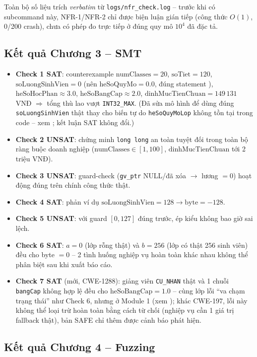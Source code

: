 Toàn bộ số liệu trích \emph{verbatim} từ \texttt{logs/nfr\_check.log} -- trước khi có subcommand này, NFR-1/NFR-2 chỉ được biện luận gián tiếp (công thức $O(1)$, 0/200 crash), chưa có phép đo trực tiếp ở đúng quy mô $10^4$ đã đặc tả.

\subsection{Kết quả Chương 3 -- SMT}

\begin{itemize}
  \item \textbf{Check 1 SAT}: counterexample $\text{numClasses}=20$, $\text{soTiet}=120$, $\text{soLuongSinhVien}=0$ (nên $\text{heSoQuyMo}=0.0$, đúng statement ), $\text{heSoHocPhan}\approx 3.0$, $\text{heSoBangCap}\approx 2.0$, $\text{dinhMucTienChuan}=149\,131$ VNĐ $\Rightarrow$ tổng thù lao vượt \texttt{INT32\_MAX}. (Đã sửa mô hình để dùng đúng \texttt{soLuongSinhVien} thật thay cho biến tự do \texttt{heSoQuyMoLop} không tồn tại trong code -- xem ; kết luận SAT không đổi.)
  \item \textbf{Check 2 UNSAT}: chứng minh \texttt{long long} an toàn tuyệt đối trong toàn bộ ràng buộc doanh nghiệp ($\text{numClasses}\in[1,100]$, $\text{dinhMucTienChuan}$ tới 2 triệu VNĐ).
  \item \textbf{Check 3 UNSAT}: guard-check (\texttt{gv\_ptr} NULL/đã xóa $\to$ lương $=0$) hoạt động đúng trên chính công thức thật.
  \item \textbf{Check 4 SAT}: phản ví dụ $\text{soLuongSinhVien}=128 \to \text{byte}=-128$.
  \item \textbf{Check 5 UNSAT}: với guard $[0,127]$ đúng trước, ép kiểu không bao giờ sai lệch.
  \item \textbf{Check 6 SAT}: $a=0$ (lớp rỗng thật) và $b=256$ (lớp có thật 256 sinh viên) đều cho byte $=0$ -- 2 tình huống nghiệp vụ hoàn toàn khác nhau không thể phân biệt sau khi xuất báo cáo.
  \item \textbf{Check 7 SAT} (mới, CWE-1288): giảng viên \texttt{CU\_NHAN} thật và 1 chuỗi \texttt{bangCap} không hợp lệ đều cho $\text{heSoBangCap}=1.0$ -- cùng lớp lỗi ``va chạm trạng thái'' như Check 6, nhưng ở Module 1 (xem ); khác CWE-197, lỗi này không thể loại trừ hoàn toàn bằng cách từ chối (nghiệp vụ cần 1 giá trị fallback thật), bản SAFE chỉ thêm được cảnh báo phát hiện.
\end{itemize}

\subsection{Kết quả Chương 4 -- Fuzzing}

